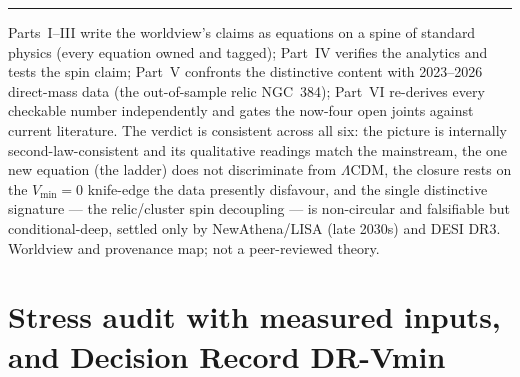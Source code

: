 \documentclass[11pt]{article}
\begin{document}
\vspace{6pt}\hrule\vspace{4pt}
{\small Parts~I--III write the worldview's claims as equations on a spine of standard physics (every equation owned and tagged); Part~IV verifies the analytics and tests the spin claim; Part~V confronts the distinctive content with 2023--2026 direct-mass data (the out-of-sample relic NGC~384); Part~VI re-derives every checkable number independently and gates the now-four open joints against current literature. The verdict is consistent across all six: the picture is internally second-law-consistent and its qualitative readings match the mainstream, the one new equation (the ladder) does not discriminate from $\Lambda$CDM, the closure rests on the $V_{\min}=0$ knife-edge the data presently disfavour, and the single distinctive signature --- the relic/cluster spin decoupling --- is non-circular and falsifiable but conditional-deep, settled only by NewAthena/LISA (late 2030s) and DESI DR3. Worldview and provenance map; not a peer-reviewed theory.}


\clearpage

\part{Stress audit with measured inputs, and Decision Record DR-Vmin}
\setcounter{section}{0}\setcounter{equation}{0}\setcounter{figure}{0}

\begin{center}\end{center}
\end{document}

